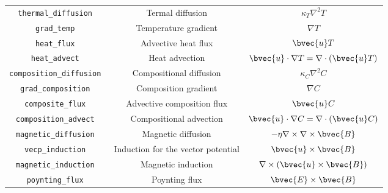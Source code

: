\begin{table}[htp]
\begin{center}
\begin{tabular}{|c|c|c|}
\hline
\tt thermal\_diffusion & Termal diffusion & $ \kappa_{T} \nabla^{2} T $ \\
\tt grad\_temp & Temperature gradient & $ \nabla T$ \\
\tt heat\_flux & Advective heat flux & $ \bvec{u} T$ \\
\tt heat\_advect & Heat advection & $ \bvec{u} \cdot \nabla T = \nabla \cdot \left(  \bvec{u} T \right) $ \\
\hline
\tt composition\_diffusion & Compositional diffusion & $ \kappa_{C} \nabla^{2} C $ \\
\tt grad\_composition & Composition gradient & $ \nabla C$ \\
\tt composite\_flux & Advective composition flux & $ \bvec{u} C$ \\
\tt composition\_advect & Compositional advection & $ \bvec{u} \cdot \nabla C = \nabla \cdot \left(  \bvec{u} C \right) $ \\
\hline
\tt magnetic\_diffusion & Magnetic diffusion
& $-\eta \nabla \times \nabla \times \bvec{B}$ \\
\tt vecp\_induction & Induction for the vector potential &  $ \bvec{u} \times \bvec{B} $ \\
\tt magnetic\_induction & Magnetic induction &  $ \nabla \times \left(\bvec{u} \times \bvec{B}\right) $ \\
\tt poynting\_flux & Poynting flux &  $ \bvec{E} \times \bvec{B} $ \\
\hline
\end{tabular}
\end{center}
\label{table:fields}
\end{table}
%
%
